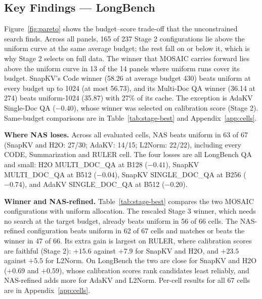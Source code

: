 \documentclass[11pt]{article}
\begin{document}
\subsection{Key Findings — LongBench}
\label{sec:which-stage}

Figure~\ref{fig:pareto} shows the budget--score trade-off that the unconstrained search finds. Across all panels, 165 of 237 Stage 2 configurations lie above the uniform curve at the same average budget; the rest fall on or below it, which is why Stage 2 selects on full data. The winner that MOSAIC carries forward lies above the uniform curve in 13 of the 14 panels where uniform runs cover its budget. SnapKV's Code winner (58.26 at average budget 430) beats uniform at every budget up to 1024 (at most 56.73), and its Multi-Doc QA winner (36.14 at 274) beats uniform-1024 (35.87) with 27\% of its cache. The exception is AdaKV Single-Doc QA ($-0.40$), whose winner was selected on calibration score (Stage 2). Same-budget comparisons are in Table~\ref{tab:stage-best} and Appendix~\ref{app:cells}.

\textbf{Where NAS loses.} Across all evaluated cells, NAS beats uniform in 63 of 67 (SnapKV and H2O: 27/30; AdaKV: 14/15; L2Norm: 22/22), including every CODE, Summarization and RULER cell. The four losses are all LongBench QA and small: H2O MULTI\_DOC\_QA at B128 ($-0.41$), SnapKV MULTI\_DOC\_QA at B512 ($-0.04$), SnapKV SINGLE\_DOC\_QA at B256 ($-0.74$), and AdaKV SINGLE\_DOC\_QA at B512 ($-0.20$).

\textbf{Winner and NAS-refined.} Table~\ref{tab:stage-best} compares the two MOSAIC configurations with uniform allocation. The rescaled Stage 3 winner, which needs no search at the target budget, already beats uniform in 56 of 66 cells. The NAS-refined configuration beats uniform in 62 of 67 cells and matches or beats the winner in 47 of 66. Its extra gain is largest on RULER, where calibration scores are faithful (Stage 2): $+15.6$ against $+7.9$ for SnapKV and H2O, and $+23.5$ against $+5.5$ for L2Norm. On LongBench the two are close for SnapKV and H2O ($+0.69$ and $+0.59$), whose calibration scores rank candidates least reliably, and NAS-refined adds more for AdaKV and L2Norm. Per-cell results for all 67 cells are in Appendix~\ref{app:cells}.
\end{document}
